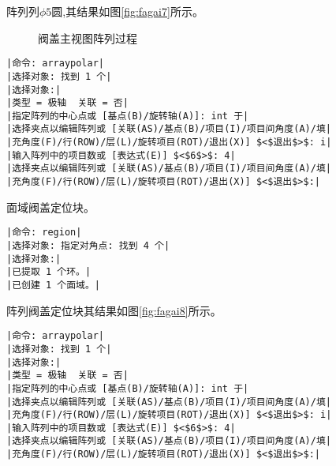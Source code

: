 \begin{procedure}
阵列列$\phi 5$圆,其结果如图\ref{fig:fagai7}所示。
\begin{figure}[htbp]
\centering
{}\hspace{30pt}
\caption{阀盖主视图阵列过程}
\end{figure}
\begin{lstlisting}
|命令: arraypolar|
|选择对象: 找到 1 个|
|选择对象:|
|类型 = 极轴  关联 = 否|
|指定阵列的中心点或 [基点(B)/旋转轴(A)]: int 于|
|选择夹点以编辑阵列或 [关联(AS)/基点(B)/项目(I)/项目间角度(A)/填|
|充角度(F)/行(ROW)/层(L)/旋转项目(ROT)/退出(X)] $<$退出$>$: i|
|输入阵列中的项目数或 [表达式(E)] $<$6$>$: 4|
|选择夹点以编辑阵列或 [关联(AS)/基点(B)/项目(I)/项目间角度(A)/填|
|充角度(F)/行(ROW)/层(L)/旋转项目(ROT)/退出(X)] $<$退出$>$:|
\end{lstlisting}

面域阀盖定位块。
\begin{lstlisting}
|命令: region|
|选择对象: 指定对角点: 找到 4 个|
|选择对象:|
|已提取 1 个环。|
|已创建 1 个面域。|
\end{lstlisting}
阵列阀盖定位块其结果如图\ref{fig:fagai8}所示。
\begin{lstlisting}
|命令: arraypolar|
|选择对象: 找到 1 个|
|选择对象:|
|类型 = 极轴  关联 = 否|
|指定阵列的中心点或 [基点(B)/旋转轴(A)]: int 于|
|选择夹点以编辑阵列或 [关联(AS)/基点(B)/项目(I)/项目间角度(A)/填|
|充角度(F)/行(ROW)/层(L)/旋转项目(ROT)/退出(X)] $<$退出$>$: i|
|输入阵列中的项目数或 [表达式(E)] $<$6$>$: 4|
|选择夹点以编辑阵列或 [关联(AS)/基点(B)/项目(I)/项目间角度(A)/填|
|充角度(F)/行(ROW)/层(L)/旋转项目(ROT)/退出(X)] $<$退出$>$:|
\end{lstlisting}
\end{procedure}
\endinput